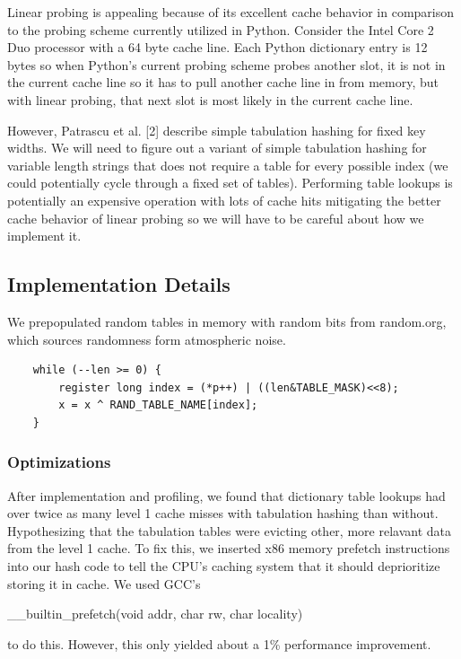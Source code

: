 \documentclass[11pt]{article}
\begin{document}
Linear probing is appealing because of its excellent cache behavior in comparison to the probing scheme currently utilized in Python.  Consider the Intel Core 2 Duo processor with a 64 byte cache line.  Each Python dictionary entry is 12 bytes so when Python’s current probing scheme probes another slot, it is not in the current cache line so it has to pull another cache line in from memory, but with linear probing, that next slot is most likely in the current cache line.

However, Patrascu et al. [2] describe simple tabulation hashing for fixed key widths.  We will need to figure out a variant of simple tabulation hashing for variable length strings that does not require a table for every possible index (we could potentially cycle through a fixed set of tables).  Performing table lookups is potentially an expensive operation with lots of cache hits mitigating the better cache behavior of linear probing so we will have to be careful about how we implement it.

\subsection{Implementation Details}
We prepopulated random tables in memory with random bits from random.org, which sources randomness form atmospheric noise.
       
       \begin{verbatim}
    while (--len >= 0) {
        register long index = (*p++) | ((len&TABLE_MASK)<<8);
        x = x ^ RAND_TABLE_NAME[index];
    }
       \end{verbatim}

\subsubsection{Optimizations}

After implementation and profiling, we found that dictionary table lookups had
over twice as many level 1 cache misses with tabulation hashing than without.
Hypothesizing that the tabulation tables were evicting other, more relavant
data from the level 1 cache.  To fix this, we inserted x86 memory prefetch
instructions into our hash code to tell the CPU's caching system that it should
deprioritize storing it in cache.  We used GCC's
\begin{tt}\_\_builtin\_prefetch(void \*addr, char rw, char locality)\end{tt}
to do this.  However, this only yielded about a 1\% performance improvement.
\end{document}
